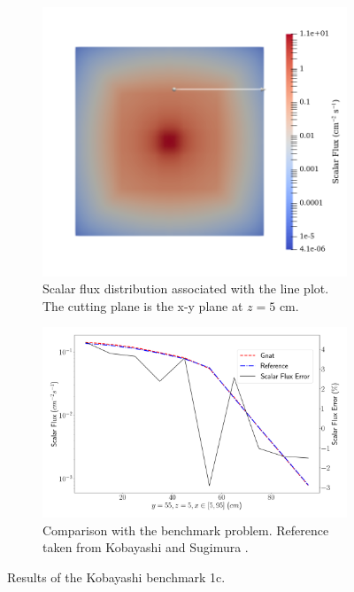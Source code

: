 \begin{figure}[H]
    \centering
    \begin{subfigure}[b]{0.4\textwidth}
        \centering
        \includegraphics[width=\textwidth]{images/verification/sn_kobayashi/1/kobayashi_1c_flux_map.png}
        \caption{Scalar flux distribution associated with the line plot. The cutting plane is the x-y plane at $z = 5\text{ cm}$.}
        \label{fig:verification:sn_kobayashi_1c:flux}
    \end{subfigure}
    \hfill
    \begin{subfigure}[b]{0.59\textwidth}
        \centering
        \includegraphics[width=\textwidth]{images/verification/sn_kobayashi/1/kobayashi_1c.png}
        \caption{Comparison with the benchmark problem. Reference taken from Kobayashi and Sugimura \cite{kobayashi_benchmarks}.}
        \label{fig:verification:sn_kobayashi_1c:line_plot}
    \end{subfigure}
    \caption{Results of the Kobayashi benchmark 1c.}
    \label{fig:verification:sn_kobayashi_1c}
\end{figure}

